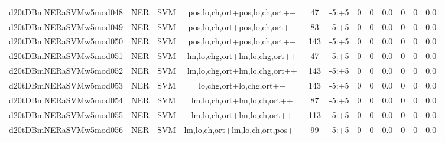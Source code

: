 \documentclass[a4paper]{article}
\begin{document}
\begin{landscape}
\begin{center}
\begin{tabular}{ |c|c|c|c|c|c|c|c|c|c|c|c|}
 	\small{ d20tDBmNERaSVMw5mod048 } & \small{ NER} & \small{  SVM }  & pos,lo,ch,ort+pos,lo,ch,ort++  &  47 &  \small{  -5:+5 }  &  0 & 0 & 0.0  &  0 & 0 & 0.0 \\
 	

 
 	
 	\small{ d20tDBmNERaSVMw5mod049 } & \small{ NER} & \small{  SVM }  & pos,lo,ch,ort+pos,lo,ch,ort++  &  83 &  \small{  -5:+5 }  &  0 & 0 & 0.0  &  0 & 0 & 0.0 \\
 	

 
 	
 	\small{ d20tDBmNERaSVMw5mod050 } & \small{ NER} & \small{  SVM }  & pos,lo,ch,ort+pos,lo,ch,ort++  &  143 &  \small{  -5:+5 }  &  0 & 0 & 0.0  &  0 & 0 & 0.0 \\
 	

 
 	
 	\small{ d20tDBmNERaSVMw5mod051 } & \small{ NER} & \small{  SVM }  & lm,lo,chg,ort+lm,lo,chg,ort++  &  47 &  \small{  -5:+5 }  &  0 & 0 & 0.0  &  0 & 0 & 0.0 \\
 	

 
 	
 	\small{ d20tDBmNERaSVMw5mod052 } & \small{ NER} & \small{  SVM }  & lm,lo,chg,ort+lm,lo,chg,ort++  &  143 &  \small{  -5:+5 }  &  0 & 0 & 0.0  &  0 & 0 & 0.0 \\
 	

 
 	
 	\small{ d20tDBmNERaSVMw5mod053 } & \small{ NER} & \small{  SVM }  & lo,chg,ort+lo,chg,ort++  &  143 &  \small{  -5:+5 }  &  0 & 0 & 0.0  &  0 & 0 & 0.0 \\
 	

 
 	
 	\small{ d20tDBmNERaSVMw5mod054 } & \small{ NER} & \small{  SVM }  & lm,lo,ch,ort+lm,lo,ch,ort++  &  87 &  \small{  -5:+5 }  &  0 & 0 & 0.0  &  0 & 0 & 0.0 \\
 	

 
 	
 	\small{ d20tDBmNERaSVMw5mod055 } & \small{ NER} & \small{  SVM }  & lm,lo,ch,ort+lm,lo,ch,ort++  &  113 &  \small{  -5:+5 }  &  0 & 0 & 0.0  &  0 & 0 & 0.0 \\
 	

 
 	
 	\small{ d20tDBmNERaSVMw5mod056 } & \small{ NER} & \small{  SVM }  & lm,lo,ch,ort+lm,lo,ch,ort,pos++  &  99 &  \small{  -5:+5 }  &  0 & 0 & 0.0  &  0 & 0 & 0.0 \\
 	


\end{tabular}
\end{center}
\end{landscape}
\end{document}
